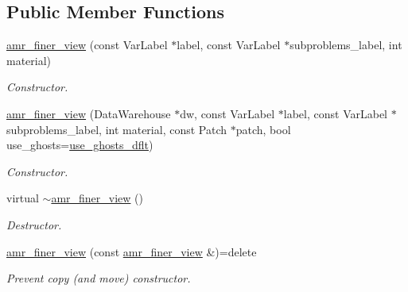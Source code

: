 \subsection*{Public Member Functions}
\begin{DoxyCompactItemize}
\item 
\hyperlink{classUintah_1_1PhaseField_1_1detail_1_1amr__finer__view_3_01ScalarField_3_01T_01_4_00_01Problem_810ae3f886a4d3bdb2b37c629369a2ec_a73afae95bc743443a5e4a72820fdacf0}{amr\+\_\+finer\+\_\+view} (const Var\+Label $\ast$label, const Var\+Label $\ast$subproblems\+\_\+label, int material)
\begin{DoxyCompactList}\small\item\em Constructor. \end{DoxyCompactList}\item 
\hyperlink{classUintah_1_1PhaseField_1_1detail_1_1amr__finer__view_3_01ScalarField_3_01T_01_4_00_01Problem_810ae3f886a4d3bdb2b37c629369a2ec_aec1b05c6c22f2d89b6f931a0b33b584c}{amr\+\_\+finer\+\_\+view} (Data\+Warehouse $\ast$dw, const Var\+Label $\ast$label, const Var\+Label $\ast$subproblems\+\_\+label, int material, const Patch $\ast$patch, bool use\+\_\+ghosts=\hyperlink{classUintah_1_1PhaseField_1_1detail_1_1amr__finer__view_3_01ScalarField_3_01T_01_4_00_01Problem_810ae3f886a4d3bdb2b37c629369a2ec_aee5138b1c87ec5e7717b5f1dd6fd47cd}{use\+\_\+ghosts\+\_\+dflt})
\begin{DoxyCompactList}\small\item\em Constructor. \end{DoxyCompactList}\item 
virtual \hyperlink{classUintah_1_1PhaseField_1_1detail_1_1amr__finer__view_3_01ScalarField_3_01T_01_4_00_01Problem_810ae3f886a4d3bdb2b37c629369a2ec_a5c34e61bae1798b170982e597180aa38}{$\sim$amr\+\_\+finer\+\_\+view} ()
\begin{DoxyCompactList}\small\item\em Destructor. \end{DoxyCompactList}\item 
\hyperlink{classUintah_1_1PhaseField_1_1detail_1_1amr__finer__view_3_01ScalarField_3_01T_01_4_00_01Problem_810ae3f886a4d3bdb2b37c629369a2ec_ae2099f71af3c5304a40a77de474052eb}{amr\+\_\+finer\+\_\+view} (const \hyperlink{classUintah_1_1PhaseField_1_1detail_1_1amr__finer__view}{amr\+\_\+finer\+\_\+view} \&)=delete
\begin{DoxyCompactList}\small\item\em Prevent copy (and move) constructor. \end{DoxyCompactList}\item 

\end{DoxyCompactItemize}
